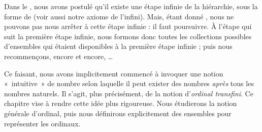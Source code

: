 \documentclass[../../../include/open-logic-section]{subfiles}
\begin{document}


Dans le , nous avons postulé qu'il existe une étape
infinie de la hiérarchie, sous la forme de \stagesinf{} (voir aussi
notre axiome de l'infini). Mais, étant donné \stagessucc{}, nous ne
pouvons pas nous arrêter à cette étape infinie : il faut poursuivre.
À l'étape qui suit la première étape infinie, nous formons donc toutes
les collections possibles d'ensembles qui étaient disponibles à la
première étape infinie ; puis nous recommençons, encore et encore,
\dots

Ce faisant, nous avons implicitement commencé à invoquer une notion
«~intuitive~» de nombre selon laquelle il peut exister des nombres
\emph{après} tous les nombres naturels. Il s'agit, plus précisément,
de la notion d'\emph{ordinal transfini}. Ce chapitre vise à rendre
cette idée plus rigoureuse. Nous étudierons la notion générale
d'ordinal, puis nous définirons explicitement des ensembles pour
représenter les ordinaux.
\end{document}
